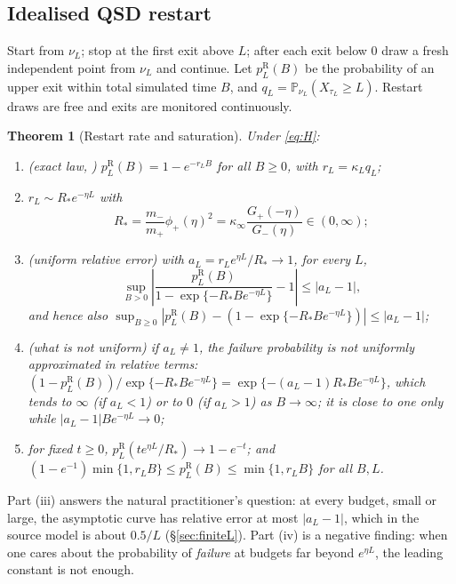 \documentclass[11pt,a4paper]{article}
\newtheorem{theorem}{Theorem}[section]
\theoremstyle{definition}
\theoremstyle{remark}
\newcommand{\Pp}{\mathbb P}
\newcommand{\1}{\mathbf 1}
\newcommand{\kinf}{\kappa_\infty}
\begin{document}
\subsection{Idealised QSD restart}
Start from $\nu_L$; stop at the first exit above $L$; after each exit below $0$ draw a fresh independent point from $\nu_L$ and continue. Let $p^{\mathrm R}_L(B)$ be the probability of an upper exit within total simulated time $B$, and $q_L=\Pp_{\nu_L}(X_{\tau_L}\ge L)$. Restart draws are free and exits are monitored continuously.
\begin{theorem}[Restart rate and saturation]\label{thm:restart}
Under \eqref{eq:H}:
\begin{enumerate}[label=(\roman*)]
\item \textup{(exact law, \cite[Lemma 6.2]{garcia})} $p^{\mathrm R}_L(B)=1-e^{-r_LB}$ for all $B\ge0$, with $r_L=\kappa_Lq_L$;
\item $r_L\sim R_*e^{-\eta L}$ with
\begin{equation}\label{eq:restart-rate}
 R_*=\frac{m_-}{m_+}\phi_+(\eta)^2=\kinf\frac{G_+(-\eta)}{G_-(\eta)}\in(0,\infty);
\end{equation}
\item \textup{(uniform relative error)} with $a_L=r_Le^{\eta L}/R_*\to1$, for every $L$,
\begin{equation}\label{eq:uniform-relative}
 \sup_{B>0}\left|\frac{p^{\mathrm R}_L(B)}{1-\exp\{-R_*Be^{-\eta L}\}}-1\right|\le|a_L-1|,
\end{equation}
and hence also $\sup_{B\ge0}|p^{\mathrm R}_L(B)-(1-\exp\{-R_*Be^{-\eta L}\})|\le|a_L-1|$;
\item \textup{(what is not uniform)} if $a_L\ne1$, the failure probability is not uniformly approximated in relative terms: $(1-p^{\mathrm R}_L(B))/\exp\{-R_*Be^{-\eta L}\}=\exp\{-(a_L-1)R_*Be^{-\eta L}\}$, which tends to $\infty$ (if $a_L<1$) or to $0$ (if $a_L>1$) as $B\to\infty$; it is close to one only while $|a_L-1|Be^{-\eta L}\to0$;
\item for fixed $t\ge0$, $p^{\mathrm R}_L(te^{\eta L}/R_*)\to1-e^{-t}$; and $(1-e^{-1})\min\{1,r_LB\}\le p^{\mathrm R}_L(B)\le\min\{1,r_LB\}$ for all $B,L$.
\end{enumerate}
\end{theorem}
Part (iii) answers the natural practitioner's question: at every budget, small or large, the asymptotic curve has relative error at most $|a_L-1|$, which in the source model is about $0.5/L$ (\S\ref{sec:finiteL}). Part (iv) is a negative finding: when one cares about the probability of \emph{failure} at budgets far beyond $e^{\eta L}$, the leading constant is not enough.
\end{document}

